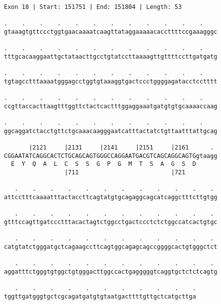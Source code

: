 \documentclass{article}
\begin{document}
\newpage
\begin{Verbatim}[fontfamily=courier]
Exon 18 | Start: 151751 | End: 151804 | Length: 53

.    .    .    .    .    .    .    .    .    .    .    .    
gtaaagtgttccctggtgaacaaaatcaagttataggaaaaacaccttttccgaaagggc

.    .    .    .    .    .    .    .    .    .    .    .    
tttgcacaaggaattgctataacttgcctgtatccttaaaagttgttttccttgatgatg

.    .    .    .    .    .    .    .    .    .    .    .    
tgtagcctttaaaatgggagcctggtgtaaaggtgactccctggggagatacctcctttt

.    .    .    .    .    .    .    .    .    .    .    .    
ccgttaccacttaagtttggttctactcactttggaggaaatgatgtgtgcaaaaccaag

.    .    .    .    .    .    .    .    .    .    .    .    
ggcaggatctacctgttctgcaaacaagggaatcatttactatctgttaatttattgcag

       |2121     |2131     |2141     |2151     |2161      . 
CGGAATATCAGGCACTCTGCAGCAGTGGGCCAGGAATGACGTCAGCAGGCAGTGgtaagg
  E  Y  Q  A  L  C  S  S  G  P  G  M  T  S  A  G  S  D      
                 |711                          |721         

   .    .    .    .    .    .    .    .    .    .    .    . 
attcctttcaaaatttactaccttcagtatgtgcagaggcagcatcaggctttcttgtgg

   .    .    .    .    .    .    .    .    .    .    .    . 
gtttccagttgatccctttacactagtctggcctgactccctctctggccatcactgtgc

   .    .    .    .    .    .    .    .    .    .    .    . 
catgtatctgggatgctcagaagccttcagtggcagagcagccggggcactgtgggctct

   .    .    .    .    .    .    .    .    .    .    .    . 
aggatttctgggtgtggctgtgggacttggccactgagggggtcaggtgctctctcagtg

   .    .    .    .    .    .    .    .    .    .    .
tggttgatgggtgctcgcagatgatgtgtaatgacttttgttgctcatgcttga
\end{Verbatim}
\newpage
\end{document}
